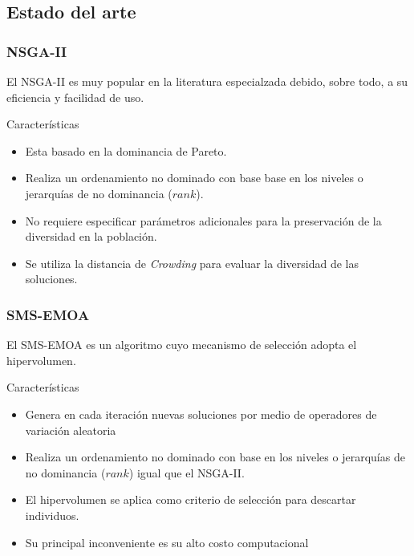 \documentclass[10pt,compress]{beamer}
\begin{document}

\subsection{Estado del arte}
\begin{frame}
	\frametitle{NSGA-II}
	El NSGA-II es muy popular en la literatura especialzada debido,  sobre todo, a su eficiencia y facilidad de uso.
	\begin{block}{Caracter\'isticas}
		\begin{itemize}
				\item Esta basado en la dominancia de Pareto.
				\item Realiza un ordenamiento no dominado con base base en los niveles o jerarqu\'ias de no dominancia ($rank$).				
				\item No requiere especificar par\'ametros adicionales para la preservaci\'on de la diversidad en la poblaci\'on.				
				\item Se utiliza la distancia de \textit{Crowding} para evaluar la diversidad de las soluciones.
  \end{itemize}
	\end{block}
\end{frame}

\begin{frame}
	\frametitle{SMS-EMOA}
	El SMS-EMOA es un algoritmo cuyo mecanismo de selecci\'on adopta el hipervolumen.
	\begin{block}{Caracter\'isticas}	
				\begin{itemize}
					\item Genera en cada iteraci\'on nuevas soluciones por medio de operadores de variaci\'on aleatoria
					\item Realiza un ordenamiento no dominado con base en los niveles o jerarqu\'ias de no dominancia ($rank$) igual que el NSGA-II.
					\item El hipervolumen se aplica como criterio de selecci\'on para descartar individuos.
					\item Su principal inconveniente es su alto costo computacional
   \end{itemize}  
	\end{block}
\end{frame}
\end{document}
